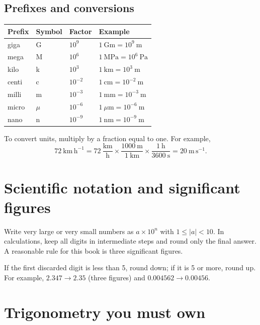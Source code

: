 \subsection{Prefixes and conversions}

\begin{center}
\renewcommand{\arraystretch}{1.15}
\begin{tabular}{@{}llll@{}}
\toprule
\textbf{Prefix} & \textbf{Symbol} & \textbf{Factor} & \textbf{Example} \\
\midrule
giga & G & $10^{9}$ & $1\ \mathrm{Gm}=10^{9}\ \mathrm{m}$ \\
mega & M & $10^{6}$ & $1\ \mathrm{MPa}=10^{6}\ \mathrm{Pa}$ \\
kilo & k & $10^{3}$ & $1\ \mathrm{km}=10^{3}\ \mathrm{m}$ \\
centi & c & $10^{-2}$ & $1\ \mathrm{cm}=10^{-2}\ \mathrm{m}$ \\
milli & m & $10^{-3}$ & $1\ \mathrm{mm}=10^{-3}\ \mathrm{m}$ \\
micro & $\mu$ & $10^{-6}$ & $1\ \mu\mathrm{m}=10^{-6}\ \mathrm{m}$ \\
nano & n & $10^{-9}$ & $1\ \mathrm{nm}=10^{-9}\ \mathrm{m}$ \\
\bottomrule
\end{tabular}
\end{center}

To convert units, multiply by a fraction equal to one. For example,
\[
72\ \mathrm{km\,h^{-1}}
=72\ \frac{\mathrm{km}}{\mathrm{h}}
\times\frac{1000\ \mathrm{m}}{1\ \mathrm{km}}
\times\frac{1\ \mathrm{h}}{3600\ \mathrm{s}}
=20\ \mathrm{m\,s^{-1}}.
\]

\section{Scientific notation and significant figures}

Write very large or very small numbers as $a\times10^{n}$ with $1\le |a|<10$.
In calculations, keep all digits in intermediate steps and round only the final
answer. A reasonable rule for this book is three significant figures.

\begin{method}[Rounding]
If the first discarded digit is less than 5, round down; if it is 5 or more,
round up. For example, $2.347\to2.35$ (three figures) and $0.004562\to0.00456$.
\end{method}

\section{Trigonometry you must own}

